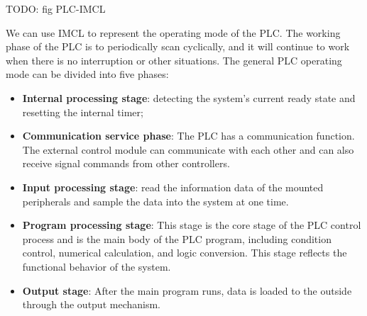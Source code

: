 TODO: fig PLC-IMCL

We can use IMCL to represent the operating mode of the PLC. The working phase of the PLC is to periodically scan cyclically, and it will continue to work when there is no interruption or other situations. The general PLC operating mode can be divided into five phases:

\begin{itemize}
  \item \textbf{Internal processing stage}: detecting the system's current ready state and resetting the internal timer;
  \item \textbf{Communication service phase}: The PLC has a communication function. The external control module can communicate with each other and can also receive signal commands from other controllers.
  \item \textbf{Input processing stage}: read the information data of the mounted peripherals and sample the data into the system at one time.
  \item \textbf{Program processing stage}: This stage is the core stage of the PLC control process and is the main body of the PLC program, including condition control, numerical calculation, and logic conversion. This stage reflects the functional behavior of the system.
  \item \textbf{Output stage}: After the main program runs, data is loaded to the outside through the output mechanism.
\end{itemize}






